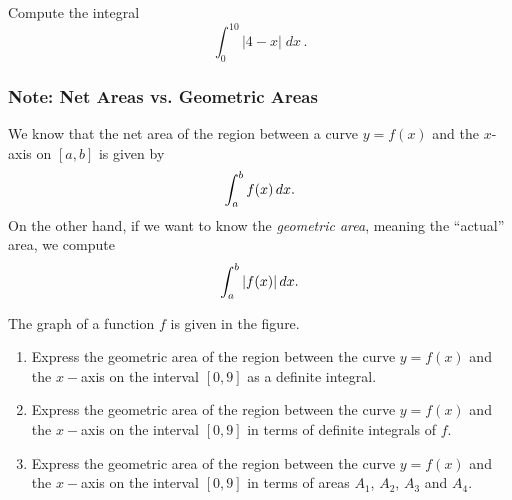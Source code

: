 \documentclass[10pt,t,handout,ignorenonframetext,aspectratio=169]{beamer}
\begin{document}
\begin{frame}
  \vs
  \begin{question}
    Compute the integral
    \[
      \int_{0}^{10} |4 - x| \; dx \,.
    \]
  \end{question}
\end{frame}

\begin{frame}
  \frametitle{Note: Net Areas vs. Geometric Areas}
  We know that the net area of the region between a curve $y=f(x)$ and the $x$-axis
  on $[a,b]$ is given by
  \[
    \int_a^b f(x) \mathop{}\!d x.
  \]
  On the other hand, if we want to know the \textit{geometric area},
  meaning the ``actual'' area, we compute
  \[
    \int_a^b |f(x)| \mathop{}\!d x.
  \]
\end{frame}


\begin{frame}
  \vs
  \begingroup
  \small
  \begin{question}
    The graph of a function $f$ is given in the figure.
    \begin{enumerate}
    \item Express the geometric area of the region between the curve
      $y=f(x)$ and the $x-$axis on the interval $[0,9]$ as a definite
      integral.
    \item Express the geometric area of the region between the curve
      $y=f(x)$ and the $x-$axis on the interval $[0,9]$ in terms of
      definite integrals of $f$.
    \item Express the geometric area of the region between the curve
      $y=f(x)$ and the $x-$axis on the interval $[0,9]$ in terms of
      areas $A_1$, $A_2$, $A_3$ and $A_4$.
    \end{enumerate}
  \end{question}
  \endgroup


\end{frame}
\end{document}
